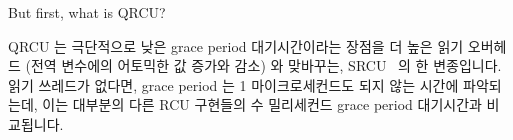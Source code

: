 But first, what is QRCU?
\fi

QRCU 는 극단적으로 낮은 grace period 대기시간이라는 장점을 더 높은 읽기
오버헤드 (전역 변수에의 어토믹한 값 증가와 감소) 와 맞바꾸는,
SRCU~\cite{PaulEMcKenney2006c} 의 한 변종입니다.
읽기 쓰레드가 없다면, grace period 는 1 마이크로세컨드도 되지 않는 시간에
파악되는데, 이는 대부분의 다른 RCU 구현들의 수 밀리세컨드 grace period
대기시간과 비교됩니다.
\iffalse

QRCU is a variant of SRCU~\cite{PaulEMcKenney2006c}
that trades somewhat higher read overhead
(atomic increment and decrement on a global variable) for extremely
low grace-period latencies.
If there are no readers, the grace period will be detected in less
than a microsecond, compared to the multi-millisecond grace-period
latencies of most other RCU implementations.
\fi

